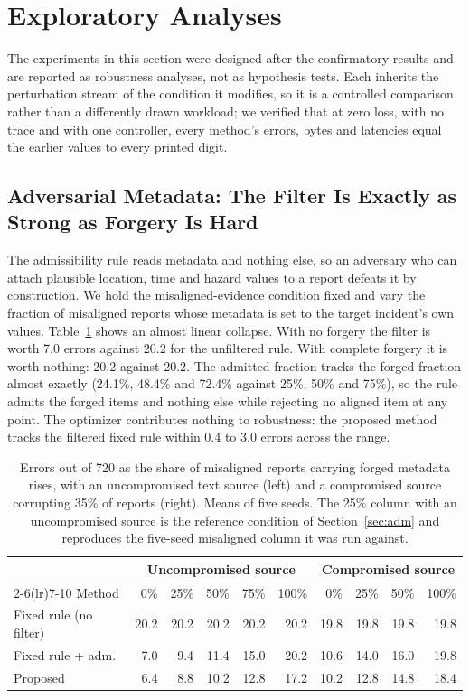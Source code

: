 \documentclass[conference,a4paper]{IEEEtran}
\newif\ifsubmission
\newcommand{\masteronly}[1]{\ifsubmission\else#1\fi}
\newcommand{\mtab}[2]{\ifsubmission#2\else Table~\ref{#1}\fi}
\begin{document}
\else
\section{Exploratory Analyses}
\label{sec:exploratory}
The experiments in this section were designed after the confirmatory results and are reported as robustness analyses, not as hypothesis tests. Each inherits the perturbation stream of the condition it modifies, so it is a controlled comparison rather than a differently drawn workload; we verified that at zero loss, with no trace and with one controller, every method's errors, bytes and latencies equal the earlier values to every printed digit.

\subsection{Adversarial Metadata: The Filter Is Exactly as Strong as Forgery Is Hard}
\label{sec:forgery}
The admissibility rule reads metadata and nothing else, so an adversary who can attach plausible location, time and hazard values to a report defeats it by construction. We hold the misaligned-evidence condition fixed and vary the fraction of misaligned reports whose metadata is set to the target incident's own values. \mtab{tab:forgery}{The full grid, in the package,} shows an almost linear collapse. With no forgery the filter is worth 7.0 errors against 20.2 for the unfiltered rule. With complete forgery it is worth nothing: 20.2 against 20.2. The admitted fraction tracks the forged fraction almost exactly (24.1\%, 48.4\% and 72.4\% against 25\%, 50\% and 75\%), so the rule admits the forged items and nothing else while rejecting no aligned item at any point. The optimizer contributes nothing to robustness: the proposed method tracks the filtered fixed rule within 0.4 to 3.0 errors across the range.

\masteronly{%
\begin{table}[t]
\caption{Errors out of 720 as the share of misaligned reports carrying forged metadata rises, with an uncompromised text source (left) and a compromised source corrupting 35\% of reports (right). Means of five seeds. The 25\% column with an uncompromised source is the reference condition of Section~\ref{sec:adm} and reproduces the five-seed misaligned column it was run against.}
\label{tab:forgery}
\centering\scriptsize
\setlength{\tabcolsep}{2.5pt}
\begin{tabular}{@{}lrrrrrrrrr@{}}
\toprule
 & \multicolumn{5}{c}{Uncompromised source} & \multicolumn{4}{c}{Compromised source} \\
\cmidrule(lr){2-6}\cmidrule(lr){7-10}
Method & 0\% & 25\% & 50\% & 75\% & 100\% & 0\% & 25\% & 50\% & 100\% \\
\midrule
Fixed rule (no filter) & 20.2 & 20.2 & 20.2 & 20.2 & 20.2 & 19.8 & 19.8 & 19.8 & 19.8 \\
Fixed rule + adm.\ & 7.0 & 9.4 & 11.4 & 15.0 & 20.2 & 10.6 & 14.0 & 16.0 & 19.8 \\
Proposed & 6.4 & 8.8 & 10.2 & 12.8 & 17.2 & 10.2 & 12.8 & 14.8 & 18.4 \\
\bottomrule
\end{tabular}
\end{table}}%
\end{document}
